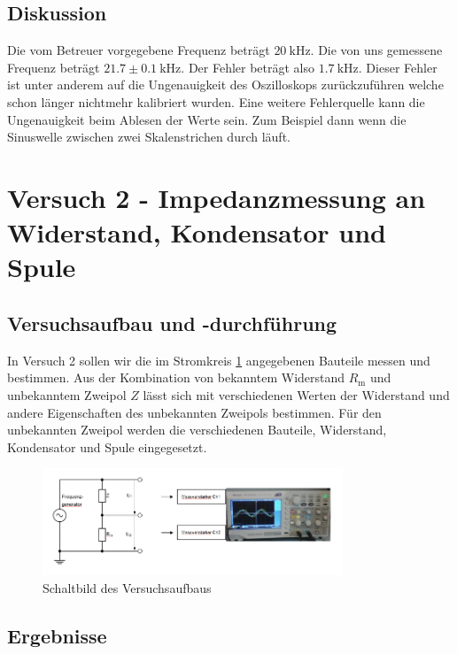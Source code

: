     \subsection{Diskussion}

    Die vom Betreuer vorgegebene Frequenz beträgt $20\ \mathrm{kHz}$. Die von uns gemessene Frequenz beträgt $21.7 \pm 0.1\ \mathrm{kHz}$. Der Fehler beträgt also $1.7\ \mathrm{kHz}$. Dieser Fehler ist unter anderem auf die Ungenauigkeit des Oszilloskops zurückzuführen welche schon länger nichtmehr kalibriert wurden. Eine weitere Fehlerquelle kann die Ungenauigkeit beim Ablesen der Werte sein. Zum Beispiel dann wenn die Sinuswelle zwischen zwei Skalenstrichen durch läuft.
    
\section{Versuch 2 - Impedanzmessung an Widerstand, Kondensator und Spule}
    
    \subsection{Versuchsaufbau und -durchführung}
        
        In Versuch 2 sollen wir die im Stromkreis \ref{fig:Versuch2_Schaltbild} angegebenen Bauteile messen und bestimmen. Aus der Kombination von bekanntem Widerstand $R_{\mathrm{m}}$ und unbekanntem Zweipol $Z$ lässt sich mit verschiedenen Werten der Widerstand und andere Eigenschaften des unbekannten Zweipols bestimmen. Für den unbekannten Zweipol werden die verschiedenen Bauteile, Widerstand, Kondensator und Spule eingegesetzt.

        \begin{figure}[H]
            \centering
            \includegraphics[width=0.8\textwidth]{bilder/Versuch2_Aufbau.png}
            \caption{Schaltbild des Versuchsaufbaus}
            \label{fig:Versuch2_Schaltbild}
        \end{figure}

    \subsection{Ergebnisse}

